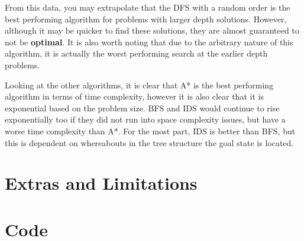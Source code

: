 \documentclass{article}
\begin{document}
	From this data, you may extrapolate that the DFS with a random order is the best performing algorithm for problems with larger depth solutions. However, although it may be quicker to find these solutions, they are almost guaranteed to not be \textbf{optimal}. It is also worth noting that due to the arbitrary nature of this algorithm, it is actually the worst performing search at the earlier depth problems.
	
	Looking at the other algorithms, it is clear that A* is the best performing algorithm in terms of time complexity, however it is also clear that it is exponential based on the problem size. BFS and IDS would continue to rise exponentially too if they did not run into space complexity issues, but have a worse time complexity than A*. For the most part, IDS is better than BFS, but this is dependent on whereabouts in the tree structure the goal state is located.
	
	\newpage
	\section{Extras and Limitations}
	
	\section{Code}
	
\end{document}
